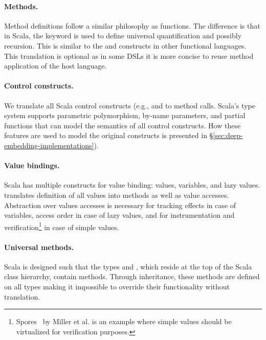 \paragraph{Methods.} Method definitions follow a similar philosophy as functions.
  The difference is that in Scala, the  keyword is used to define universal quantification and possibly recursion.
  This is similar to the  and  constructs in other functional languages. This translation is optional
  as in some DSLs it is more concise to reuse method application of the host language.


 \paragraph{Control constructs.} We translate all Scala control constructs (e.g., and  to method calls.
  Scala's type system supports parametric polymorphism, by-name parameters, and partial functions that can model
  the semantics of all control constructs. How these features are used to model the original constructs is presented in \S \ref{sec:deep-embedding-implementations}).

 \paragraph{Value bindings.} Scala has multiple constructs for value binding: values, variables, and lazy values. \yy translates
  definition of all values into methods as well as value accesses. Abstraction over values accesses is
  necessary for tracking effects in case of variables, access order in case of lazy values, and for instrumentation and verification\footnote{Spores~\cite{miller2014spores} by Miller et al. is an example where simple values should be virtualized for verification purposes.}
  in case of simple values.

 \paragraph{Universal methods.} Scala is designed such that the types  and
 , which reside at the top of the Scala class hierarchy, contain
  methods. Through inheritance, these methods are defined on all
 types making it impossible to override their functionality without translation.

